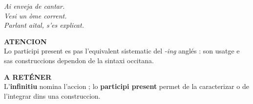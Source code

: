 \documentclass[a4paper,11pt]{article}
\begin{document}
\begin{minipage}{.94\textwidth}
\begin{minipage}{.485\textwidth}
\begin{neutralbox}[height=3.15cm]
\textit{Ai enveja de cantar.}\\
\textit{Vesi un òme corrent.}\\
\textit{Parlant aital, s'es explicat.}
\end{neutralbox}\end{minipage}\hfill
\begin{minipage}{.485\textwidth}\begin{warnbox}[height=3.15cm]
\textbf{\color{Red}ATENCION}\\[1mm]
Lo participi present es pas l'equivalent sistematic del \textit{-ing} anglés : son usatge e sas construccions dependon de la sintaxi occitana.
\end{warnbox}\end{minipage}
\vspace{2mm}\begin{neutralbox}\textbf{\color{NeutralDark}A RETÉNER}\\[1mm]
L'\textbf{infinitiu} nomina l'accion ; lo \textbf{participi present} permet de la caracterizar o de l'integrar dins una construccion.
\end{neutralbox}
\vspace{1.5mm}
\end{minipage}
\end{document}
